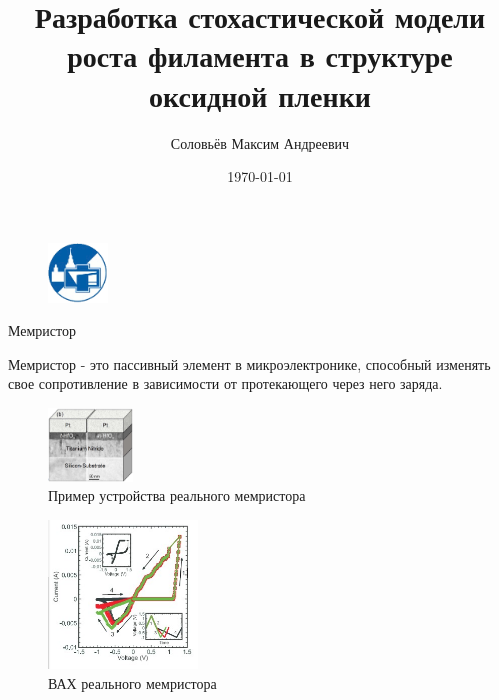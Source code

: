 \documentclass{beamer}%
\begin{document}

\title{Разработка стохастической модели роста филамента в структуре оксидной пленки}
\author{Соловьёв Максим Андреевич}
\date{\today}



\begin{frame}%
\begin{figure}
    \centering
    \includegraphics[width=60px]{img/ff-sign.png}
\end{figure}
\maketitle
\end{frame}

\begin{frame}{Мемристор}
\begin{multicols}{2}
Мемристор - это пассивный элемент в микроэлектронике, способный изменять свое сопротивление в зависимости от протекающего через него заряда. 
\begin{figure}
    \centering
    \includegraphics[width=85px]{img/real_memristor.PNG}
    \caption{Пример устройства реального мемристора%
\footnotemark[1]
}
\end{figure}
\columnbreak
    \begin{figure}
        \centering
        \includegraphics[width=150px]{img/vac_memrister.jpg}
        \caption{ВАХ реального мемристора%
    \footnotemark[1]
    }
    \end{figure}
\end {multicols}
\end{frame}
\end{document}
